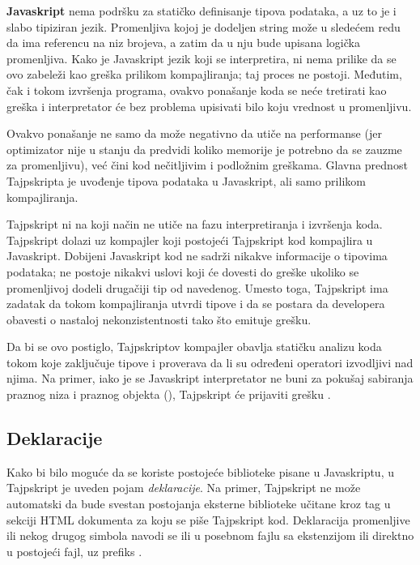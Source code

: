\textbf{Javaskript} nema podršku za statičko definisanje tipova podataka, a uz to je i slabo tipiziran jezik.
Promenljiva kojoj je dodeljen string može u sledećem redu da ima referencu na niz brojeva, a zatim da u nju bude upisana logička promenljiva.
Kako je Javaskript jezik koji se interpretira, ni nema prilike da se ovo zabeleži kao greška prilikom kompajliranja; taj proces ne postoji.
Međutim, čak i tokom izvršenja programa, ovakvo ponašanje koda se neće tretirati kao greška i interpretator će bez problema upisivati bilo koju vrednost u promenljivu.

Ovakvo ponašanje ne samo da može negativno da utiče na performanse (jer optimizator nije u stanju da predvidi koliko memorije je potrebno da se zauzme za promenljivu), već čini kod nečitljivim i podložnim greškama.
Glavna prednost Tajpskripta je uvođenje tipova podataka u Javaskript, ali samo prilikom kompajliranja.

Tajpskript ni na koji način ne utiče na fazu interpretiranja i izvršenja koda.
Tajpskript dolazi uz kompajler koji postojeći Tajpskript kod kompajlira u Javaskript.
Dobijeni Javaskript kod ne sadrži nikakve informacije o tipovima podataka; ne postoje nikakvi uslovi koji će dovesti do greške ukoliko se promenljivoj dodeli drugačiji tip od navedenog.
Umesto toga, Tajpskript ima zadatak da tokom kompajliranja utvrdi tipove i da se postara da developera obavesti o nastaloj nekonzistentnosti tako što emituje grešku.

Da bi se ovo postiglo, Tajpskriptov kompajler obavlja statičku analizu koda tokom koje zaključuje tipove i proverava da li su određeni operatori izvodljivi nad njima.
Na primer, iako je se Javaskript interpretator ne buni za pokušaj sabiranja praznog niza i praznog objekta (\code{[] + \{\}}), Tajpskript će prijaviti grešku .

\subsection{Deklaracije}

Kako bi bilo moguće da se koriste postojeće biblioteke pisane u Javaskriptu, u Tajpskript je uveden pojam \textit{deklaracije}.
Na primer, Tajpskript ne može automatski da bude svestan postojanja eksterne biblioteke učitane kroz  tag u  sekciji HTML dokumenta za koju se piše Tajpskript kod.
Deklaracija promenljive ili nekog drugog simbola navodi se ili u posebnom fajlu sa ekstenzijom  ili direktno u postojeći fajl, uz prefiks .

